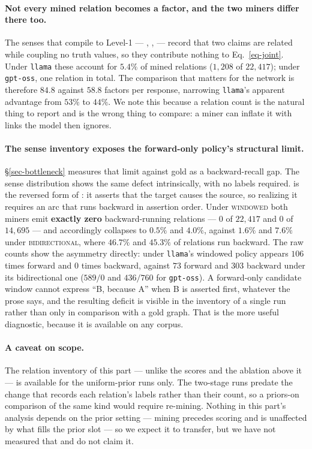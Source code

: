 \paragraph{Not every mined relation becomes a factor, and the two miners differ there too.} The
senses that compile to Level-1  --- , ,
 --- record that two claims are related while coupling no truth values, so they
contribute nothing to Eq.~\ref{eq-joint}. Under \texttt{llama} these account for $5.4\%$ of mined
relations ($1{,}208$ of $22{,}417$); under \texttt{gpt-oss}, one relation in total. The comparison that
matters for the network is therefore $84.8$ against $58.8$ factors per response, narrowing
\texttt{llama}'s apparent advantage from $53\%$ to $44\%$. We note this because a relation count is the
natural thing to report and is the wrong thing to compare: a miner can inflate it with links the model
then ignores.

\paragraph{The sense inventory exposes the forward-only policy's structural limit.}
\S\ref{sec-bottleneck} measures that limit against gold as a backward-recall gap. The sense
distribution shows the same defect intrinsically, with no labels required.  is the
reversed form of : it asserts that the target causes the source, so realizing it
requires an arc that runs backward in assertion order. Under \textsc{windowed} both miners emit
\textbf{exactly zero} backward-running relations --- $0$ of $22{,}417$ and $0$ of $14{,}695$ --- and
 accordingly collapses to $0.5\%$ and $4.0\%$, against $1.6\%$ and $7.6\%$ under
\textsc{bidirectional}, where $46.7\%$ and $45.3\%$ of relations run backward. The raw counts show the
asymmetry directly: under \texttt{llama}'s windowed policy  appears $106$ times
forward and $0$ times backward, against $73$ forward and $303$ backward under its bidirectional one
($589/0$ and $436/760$ for \texttt{gpt-oss}). A forward-only candidate window cannot express
``B, because A'' when B is asserted first, whatever the prose says, and the resulting deficit is visible
in the inventory of a single run rather than only in comparison with a gold graph. That is the more
useful diagnostic, because it is available on any corpus.

\paragraph{A caveat on scope.} The relation inventory of this part --- unlike the scores and the
ablation above it --- is available for the uniform-prior runs only. The two-stage runs predate the change
that records each relation's labels rather than their count, so a priors-on comparison of the same kind
would require re-mining. Nothing in this part's analysis depends on the prior setting --- mining precedes
scoring and is unaffected by what fills the prior slot --- so we expect it to transfer, but we have not
measured that and do not claim it.

